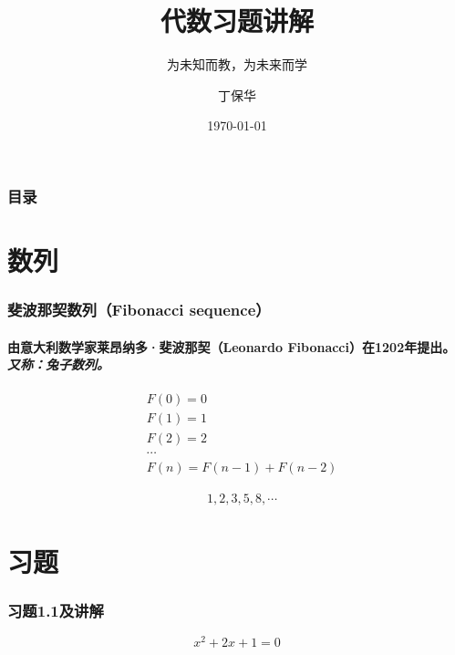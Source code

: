 \documentclass[t]{ctexbeamer} %
\begin{document}
\title{代数习题讲解}
\subtitle{为未知而教，为未来而学}
\author{丁保华}
\date{\today}
\maketitle

\begin{frame}[t]
\frametitle{目录}
\tableofcontents
\end{frame}

\section{数列}
\begin{frame}
\frametitle{斐波那契数列（Fibonacci sequence）}
\framesubtitle{由意大利数学家莱昂纳多·斐波那契（Leonardo Fibonacci）在1202年提出。 \textit{又称：兔子数列。}}
\vspace{1cm}
\begin{definition}
\[
\begin{aligned}
&F(0)=0 \\
&F(1)=1 \\
&F(2)=2 \\
&\cdots \\
&F(n)=F(n-1)+F(n-2)
\end{aligned}
\]
\end{definition}

\begin{examples}
\[
\begin{aligned}
&1, 2, 3, 5, 8, \cdots
\end{aligned}
\]
\end{examples}

\end{frame}


\section{习题}
\begin{frame}
\frametitle{习题1.1及讲解}
\begin{problem}
\[
x^2+2x+1=0
\]
\end{problem}

\end{frame}
\end{document}
